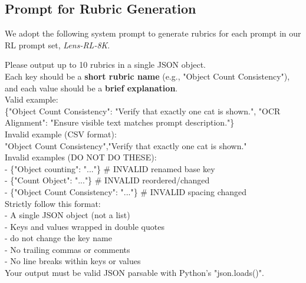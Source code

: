 


\subsection{Prompt for Rubric Generation}
\label{sec:prompt-rubric}

We adopt the following system prompt to generate rubrics for each prompt in our RL prompt set, \textit{Lens-RL-8K}.

\begin{tcolorbox}[
  breakable,
  enhanced,
  colback=white,
  colframe=black!70,
  boxrule=0.8pt,
  arc=2pt,
  title={Prompt for Rubric Generation},
  colbacktitle=black!75,
  coltitle=white,
  fonttitle=\bfseries,
  left=8pt,right=8pt,top=8pt,bottom=8pt
]
\footnotesize
Please output up to 10 rubrics in a single JSON object.\\
Each key should be a \textbf{short rubric name} (e.g., "Object Count Consistency"), and each value should be a \textbf{brief explanation}.\\
Valid example:\\
\{"Object Count Consistency": "Verify that exactly one cat is shown.", "OCR Alignment": "Ensure visible text matches prompt description."\}\\
Invalid example (CSV format):\\
"Object Count Consistency","Verify that exactly one cat is shown."\\
Invalid examples (DO NOT DO THESE):\\
- \{"Object counting": "..."\} \hspace{1em} \# INVALID renamed base key\\
- \{"Count Object": "..."\} \hspace{1em} \# INVALID reordered/changed\\
- \{"Object  Count  Consistency": "..."\} \# INVALID spacing changed\\
Strictly follow this format:\\
- A single JSON object (not a list)\\
- Keys and values wrapped in double quotes\\
- do not change the key name\\
- No trailing commas or comments\\
- No line breaks within keys or values\\
Your output must be valid JSON parsable with Python's "json.loads()".
\end{tcolorbox}


